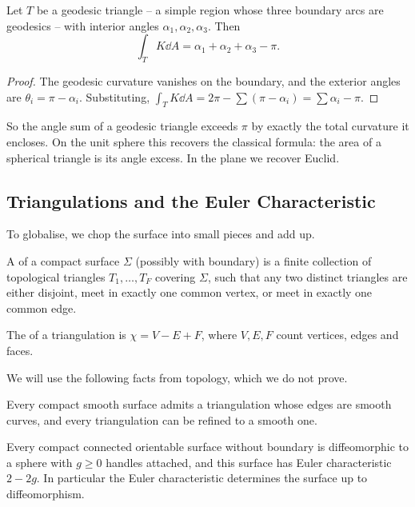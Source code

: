 \documentclass[a4paper]{scrartcl}
\begin{document}
\begin{corollary}
    Let $T$ be a geodesic triangle -- a simple region whose three boundary arcs are geodesics -- with interior angles $\alpha_1,\alpha_2,\alpha_3$. Then
    $$
    \int_T K \dd A = \alpha_1+\alpha_2+\alpha_3 - \pi.
    $$
\end{corollary}
\begin{proof}
    The geodesic curvature vanishes on the boundary, and the exterior angles are $\theta_i = \pi - \alpha_i$. Substituting, $\int_T K \dd A = 2\pi - \sum(\pi - \alpha_i) = \sum\alpha_i - \pi$.
\end{proof}

So the angle sum of a geodesic triangle exceeds $\pi$ by exactly the total curvature it encloses. On the unit sphere this recovers the classical formula: the area of a spherical triangle is its angle excess. In the plane we recover Euclid.

\subsection{Triangulations and the Euler Characteristic}

To globalise, we chop the surface into small pieces and add up.

\begin{definition}[Triangulation]
    A  of a compact surface $\Sigma$ (possibly with boundary) is a finite collection of topological triangles $T_1,\dots,T_F$ covering $\Sigma$, such that any two distinct triangles are either disjoint, meet in exactly one common vertex, or meet in exactly one common edge.
\end{definition}

\begin{definition}
    The  of a triangulation is $\chi = V - E + F$, where $V, E, F$ count vertices, edges and faces.
\end{definition}

We will use the following facts from topology, which we do not prove.

\begin{fact}
    Every compact smooth surface admits a triangulation whose edges are smooth curves, and every triangulation can be refined to a smooth one.
\end{fact}

\begin{fact}
    Every compact connected orientable surface without boundary is diffeomorphic to a sphere with $g \geq 0$ handles attached, and this surface has Euler characteristic $2 - 2g$. In particular the Euler characteristic determines the surface up to diffeomorphism.
\end{fact}
\end{document}
